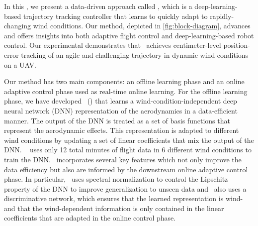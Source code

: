 In this , we present a data-driven approach called \nf, which is a deep-learning-based trajectory tracking controller that learns to quickly adapt to rapidly-changing wind conditions. 
Our method, depicted in \cref{fig:block-diagram}, advances and offers insights into both adaptive flight control and deep-learning-based robot control.
Our experimental demonstrates that \nf~achieves centimeter-level position-error tracking of an agile and challenging trajectory in dynamic wind conditions on a  UAV.

Our method has two main components: an offline learning phase and an online adaptive control phase used as real-time online learning. For the offline learning phase, we have developed \LearningAlg~(\DAML) that learns a wind-condition-independent deep neural network (DNN) representation of the aerodynamics in a data-efficient manner. 
The output of the DNN is treated as a set of basis functions that represent the aerodynamic effects. This representation is adapted to different wind conditions by updating a set of linear coefficients that mix the output of the DNN. 
\DAML~ uses only 12 total minutes of flight data in  6 different wind conditions to train the DNN. 
\DAML~incorporates several key features which not only improve the data efficiency but also are informed by the downstream online adaptive control phase. In particular, \DAML~uses spectral normalization \cite{shi2019neural,bartlett2017spectrally} to control the Lipschitz property of the DNN to improve generalization to unseen data and  \DAML~also uses a discriminative network, which ensures that the learned representation is wind- and that the wind-dependent information is only contained in the linear coefficients that are adapted in the online control phase.

